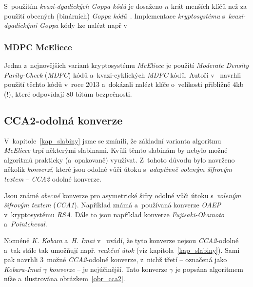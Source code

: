 \documentclass[thesis=M,czech,hidelinks]{FITthesis}[2012/06/26]
\newcommand{\0}{{\textcolor[gray]{0.75}{0}}}
\begin{document}
S~použitím \emph{kvazi-dyadických Goppa kódů} je dosaženo $n$ krát menších klíčů
než za použití obecných (binárních) \emph{Goppa kódů}~\cite{Misoczki1}.
Implementace \emph{kryptosystému} s~\emph{kvazi-dyadickými Goppa} kódy lze
nalézt např v~\cite{Paustjan,Kratochvil}


\subsubsection{MDPC McEliece}\label{kap_MDPC}

Jedna z~nejnovějších variant kryptosystému \emph{McEliece} je použití
\emph{Moderate Density Parity-Check} (\emph{MDPC}) kódů a~kvazi-cyklických
\emph{MDPC} kódů.  Autoři v~\cite{Misoczki2} navrhli použití těchto kódů v~roce
2013 a~dokázali nalézt klíče o~velikosti přibližně $4$\;kb (!), které odpovídají
$80$ bitům bezpečnosti.


\subsection{CCA2-odolná konverze}\label{kap_cca2}

V~kapitole~\ref{kap_slabiny} jsme se zmínili, že základní varianta algoritmu
\emph{McEliece} trpí některými slabinami. Kvůli těmto slabinám by nebylo možné
algoritmů prakticky (a~opakovaně) využívat. Z~tohoto důvodu bylo navrženo
několik \emph{konverzí}, které jsou odolné vůči útoku s~\emph{adaptivně voleným
šifrovým textem} -- \emph{CCA2} odolné konverze.

Jsou známé \emph{obecné} konverze pro asymetrické šifry odolné vůči útoku
s~\emph{voleným šifrovým textem} (\emph{CCA1}). Například známá a~používaná
konverze \emph{OAEP} v~kryptosystému \emph{RSA}. Dále to jsou například konverze
\emph{Fujisaki-Okamoto} a~\emph{Pointcheval}.

Nicméně \emph{K. Kobara} a~\emph{H. Imai} v~\cite{Kobara} uvádí, že tyto
konverze nejsou \emph{CCA2}-odolné a~tak stále tak umožňují např. \emph{reakční
útok} (viz kapitola~\ref{kap_slabiny}). Sami pak navrhli 3~možné
\emph{CCA2}-odolné konverze, z~nichž třetí -- označená jako \emph{Kobara-Imai
$\gamma$ konverze} -- je nejúčinější. Tato konverze $\gamma$ je popsána
algoritmem níže a~ilustrována obrázkem~\ref{obr_cca2}.
\end{document}
